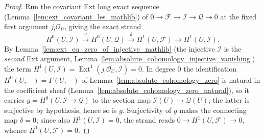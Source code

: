 \begin{proof}
    \leanok
  Run the covariant Ext long exact sequence
  (Lemma~\ref{lem:ext_covariant_les_mathlib}) of
  \(0 \to \mathcal{F} \to \mathcal{I} \to \mathcal{Q} \to 0\) at the fixed first
  argument \(j_!\mathcal{O}_U\), giving the exact strand
  \[
    H^0(U, \mathcal{I}) \xrightarrow{\ g\ } H^0(U, \mathcal{Q})
      \xrightarrow{\ \delta\ } H^1(U, \mathcal{F}) \to H^1(U, \mathcal{I}).
  \]
  By Lemma~\ref{lem:ext_eq_zero_of_injective_mathlib} (the injective \(\mathcal{I}\) is
  the \emph{second} Ext argument, Lemma~\ref{lem:absolute_cohomology_injective_vanishing})
  the term \(H^1(U, \mathcal{I}) =
  \operatorname{Ext}^1(j_!\mathcal{O}_U, \mathcal{I}) = 0\). In degree \(0\) the
  identification \(H^0(U, -) = \Gamma(U, -)\) of Lemma~\ref{lem:absolute_cohomology_zero}
  is natural in the coefficient sheaf
  (Lemma~\ref{lem:absolute_cohomology_zero_natural}), so it carries \(g = H^0(U,
  \mathcal{I} \to \mathcal{Q})\) to the section map
  \(\mathcal{I}(U) \to \mathcal{Q}(U)\); the latter is surjective by hypothesis, hence so is
  \(g\). Surjectivity of \(g\) makes the connecting map
  \(\delta = 0\); since also \(H^1(U, \mathcal{I}) = 0\), the strand reads
  \(0 \to H^1(U, \mathcal{F}) \to 0\), whence \(H^1(U, \mathcal{F}) = 0\).
\end{proof}

